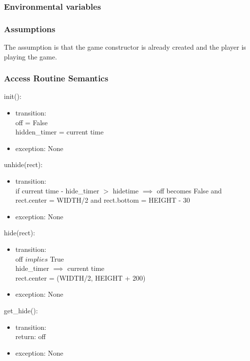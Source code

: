 \documentclass[12pt, titlepage]{article}
\begin{document}
\subsubsection {Environmental variables}

\subsubsection {Assumptions}
The assumption is that the game constructor is already created and the player is playing the game.

\subsubsection {Access Routine Semantics}

\noindent init():
\begin{itemize}
\item transition:\\
off = False\\
hidden\_timer = current time\\
\item exception: None
\end{itemize}

\noindent unhide(rect):
\begin{itemize}
\item transition:\\
if current time - hide\_timer $>$ hidetime $\implies$ off becomes False and rect.center = WIDTH/2 and rect.bottom = HEIGHT - 30\\
\item exception: None
\end{itemize}

\noindent hide(rect):
\begin{itemize}
\item transition:\\
off $implies$ True\\
hide\_timer $\implies$ current time\\
rect.center = (WIDTH/2, HEIGHT + 200)\\
\item exception: None
\end{itemize}

\noindent get\_hide():
\begin{itemize}
\item transition:\\
return: off\\
\item exception: None
\end{itemize}
\end{document}
